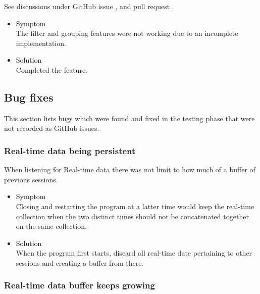\documentclass[oneside, english, final]{design}
\begin{document}
See discussions under GitHub issue \href{https://github.com/DHSTTOS/implementation/issues/86}{\color{blue}{\#86}}, \href{https://github.com/DHSTTOS/implementation/issues/86}{\color{blue}{\#74}} and pull request \href{https://github.com/DHSTTOS/implementation/issues/101}{\color{blue}{\#101}}.

\begin{itemize}
      \item{Symptom
            \\
            The filter and grouping features were not working due to an incomplete implementation.}

      \item{Solution
            \\
            Completed the feature.
            }
\end{itemize}


\newpage

\subsection{Bug fixes}

This section lists bugs which were found and fixed in the testing phase that were not recorded as GitHub issues.
\\



\subsubsection{Real-time data being persistent}

When listening for Real-time data there was not limit to how much of a buffer of previous sessions.

\begin{itemize}
      \item{Symptom
            \\
            Closing and restarting the program at a latter time would keep the real-time collection when the two distinct times should not be concatenated together on the same collection.
	}
      \item{Solution
            \\
            When the program first starts, discard all real-time date pertaining to other sessions and creating a buffer from there.
            }
\end{itemize}


\subsubsection{Real-time data buffer keeps growing}
\end{document}

